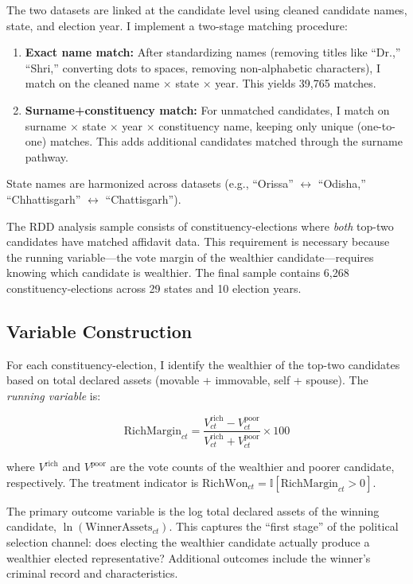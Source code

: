 \documentclass[12pt]{article}
\newcommand{\ind}{\mathbb{I}}
\begin{document}
The two datasets are linked at the candidate level using cleaned candidate names, state, and election year. I implement a two-stage matching procedure:

\begin{enumerate}
\item \textbf{Exact name match:} After standardizing names (removing titles like ``Dr.,'' ``Shri,'' converting dots to spaces, removing non-alphabetic characters), I match on the cleaned name $\times$ state $\times$ year. This yields 39,765 matches.
\item \textbf{Surname+constituency match:} For unmatched candidates, I match on surname $\times$ state $\times$ year $\times$ constituency name, keeping only unique (one-to-one) matches. This adds additional candidates matched through the surname pathway.
\end{enumerate}

State names are harmonized across datasets (e.g., ``Orissa'' $\leftrightarrow$ ``Odisha,'' ``Chhattisgarh'' $\leftrightarrow$ ``Chattisgarh'').

The RDD analysis sample consists of constituency-elections where \textit{both} top-two candidates have matched affidavit data. This requirement is necessary because the running variable---the vote margin of the wealthier candidate---requires knowing which candidate is wealthier. The final sample contains 6,268 constituency-elections across 29 states and 10 election years.

\subsection{Variable Construction}

For each constituency-election, I identify the wealthier of the top-two candidates based on total declared assets (movable + immovable, self + spouse). The \textit{running variable} is:

\begin{equation}
\text{RichMargin}_{ct} = \frac{V^{\text{rich}}_{ct} - V^{\text{poor}}_{ct}}{V^{\text{rich}}_{ct} + V^{\text{poor}}_{ct}} \times 100
\end{equation}

\noindent where $V^{\text{rich}}$ and $V^{\text{poor}}$ are the vote counts of the wealthier and poorer candidate, respectively. The treatment indicator is $\text{RichWon}_{ct} = \ind[\text{RichMargin}_{ct} > 0]$.

The primary outcome variable is the log total declared assets of the winning candidate, $\ln(\text{WinnerAssets}_{ct})$. This captures the ``first stage'' of the political selection channel: does electing the wealthier candidate actually produce a wealthier elected representative? Additional outcomes include the winner's criminal record and characteristics.
\end{document}
